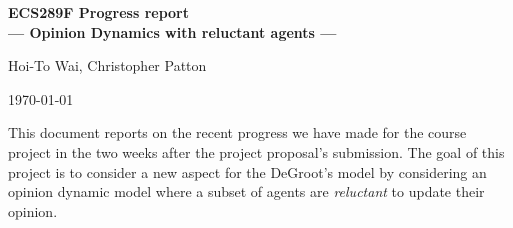 \documentclass[letter]{article}
\theoremstyle{t}
\begin{document}
\setcounter{page}{1}
\linespread{1.1}
\normalsize

\setlength{\parskip}{.2cm}

\begin{center} {\Large \textbf{
ECS289F Progress report\vspace{.2cm} \\ --- Opinion Dynamics with  reluctant agents ---}} \vspace{.3cm}

{Hoi-To Wai, Christopher Patton}

\today

\end{center}
\vspace{0.1cm}





This document reports on the recent progress we have made for the course project in the two weeks after the project proposal's submission. The goal of this project is to consider a new aspect for the DeGroot's model by considering an opinion dynamic model where a subset of agents are \emph{reluctant} to update their opinion. 

\end{document}
